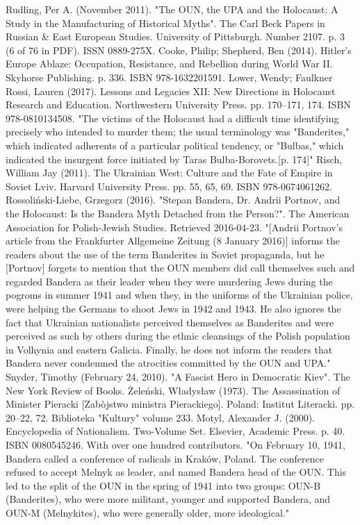 Rudling, Per A. (November 2011). "The OUN, the UPA and the Holocaust: A Study in the Manufacturing of Historical Myths". The Carl Beck Papers in Russian & East European Studies. University of Pittsburgh. Number 2107. p. 3 (6 of 76 in PDF). ISSN 0889-275X.
Cooke, Philip; Shepherd, Ben (2014). Hitler's Europe Ablaze: Occupation, Resistance, and Rebellion during World War II. Skyhorse Publishing. p. 336. ISBN 978-1632201591.
Lower, Wendy; Faulkner Rossi, Lauren (2017). Lessons and Legacies XII: New Directions in Holocaust Research and Education. Northwestern University Press. pp. 170–171, 174. ISBN 978-0810134508. "The victims of the Holocaust had a difficult time identifying precisely who intended to murder them; the usual terminology was "Banderites," which indicated adherents of a particular political tendency, or "Bulbas," which indicated the insurgent force initiated by Taras Bulba-Borovets.[p. 174]"
Risch, William Jay (2011). The Ukrainian West: Culture and the Fate of Empire in Soviet Lviv. Harvard University Press. pp. 55, 65, 69. ISBN 978-0674061262.
Rossoliński-Liebe, Grzegorz (2016). "Stepan Bandera, Dr. Andrii Portnov, and the Holocaust: Is the Bandera Myth Detached from the Person?". The American Association for Polish-Jewish Studies. Retrieved 2016-04-23. "[Andrii Portnov's article from the Frankfurter Allgemeine Zeitung (8 January 2016)] informs the readers about the use of the term Banderites in Soviet propaganda, but he [Portnov] forgets to mention that the OUN members did call themselves such and regarded Bandera as their leader when they were murdering Jews during the pogroms in summer 1941 and when they, in the uniforms of the Ukrainian police, were helping the Germans to shoot Jews in 1942 and 1943. He also ignores the fact that Ukrainian nationalists perceived themselves as Banderites and were perceived as such by others during the ethnic cleansings of the Polish population in Volhynia and eastern Galicia. Finally, he does not inform the readers that Bandera never condemned the atrocities committed by the OUN and UPA."
Snyder, Timothy (February 24, 2010). "A Fascist Hero in Democratic Kiev". The New York Review of Books.
Żeleński, Władysław (1973). The Assassination of Minister Pieracki [Zabòjstwo ministra Pierackiego]. Poland: Institut Literacki. pp. 20–22, 72. Biblioteka "Kultury" volume 233.
Motyl, Alexander J. (2000). Encyclopedia of Nationalism. Two-Volume Set. Elsevier, Academic Press. p. 40. ISBN 0080545246. With over one hundred contributors. "On February 10, 1941, Bandera called a conference of radicals in Kraków, Poland. The conference refused to accept Melnyk as leader, and named Bandera head of the OUN. This led to the split of the OUN in the spring of 1941 into two groups: OUN-B (Banderites), who were more militant, younger and supported Bandera, and OUN-M (Melnykites), who were generally older, more ideological."
